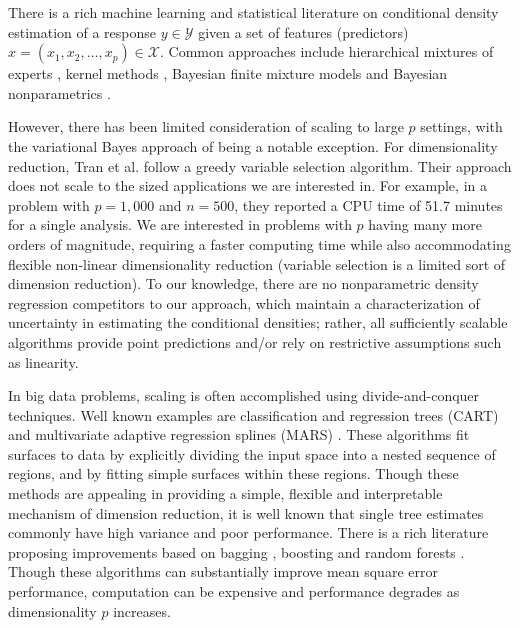 There is a rich machine learning and statistical literature on conditional density estimation of a response $y \in \mathcal{Y}$ given a set of features (predictors) $x=(x_1, x_2, \ldots, x_p)\in \mathcal{X}$. Common approaches include hierarchical mixtures of experts \cite{mixtureexperts,jiang1999}, kernel methods \cite{fan1996,fanyim2004,holmes2010,fu2011}, Bayesian finite mixture models \cite{nott2012,tran2012,norets2012} and Bayesian nonparametrics 
\cite{griffin06, dunson2007, DunsonPark, chung2009, tokdar2010}.  

However, there has been limited consideration of scaling to large $p$ settings, with the variational Bayes approach of \cite{tran2012} being a notable exception. For dimensionality reduction, Tran et al. follow a greedy variable selection algorithm.  Their approach does not scale to the sized applications we are interested in. For example, in a problem with $p=1,000$ and $n=500$, they reported a CPU time of 51.7 minutes for a single analysis.  We are interested in problems with  $p$ having many more orders of magnitude, requiring a faster computing time while also accommodating flexible non-linear dimensionality reduction (variable selection is a limited sort of dimension reduction).  To our knowledge, there are no nonparametric density regression competitors to our approach, which maintain a characterization of uncertainty in estimating the conditional densities; rather, all sufficiently scalable algorithms provide point predictions and/or rely on restrictive assumptions such as linearity.  

In big data problems, scaling is often accomplished using divide-and-conquer techniques. Well known examples are classification and regression trees (CART) \cite{CART} and multivariate adaptive regression splines (MARS) \cite{MARS}. These algorithms fit surfaces to data by explicitly dividing the input space into a nested sequence of regions, and by fitting simple surfaces  within these regions. Though these methods are appealing in providing a simple, flexible and interpretable mechanism of dimension reduction, it is well known that single tree estimates commonly have high variance and poor performance.  There is a rich literature proposing improvements based on bagging \cite{Bagging}, boosting \cite{Boosting} and random forests \cite{RandomForest}. Though these algorithms can substantially improve mean square error performance, computation can be expensive and performance degrades as dimensionality $p$ increases.

